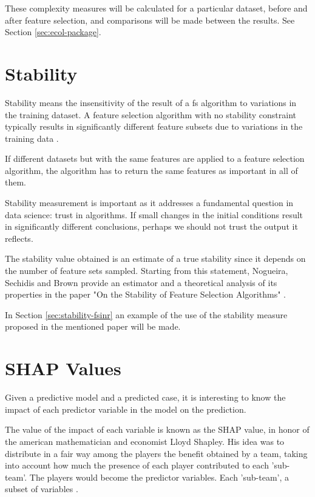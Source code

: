 These complexity measures will be calculated for a particular dataset, before and after feature selection, and comparisons will be made between the results. See Section \ref{sec:ecol-package}.

\section{Stability}
\label{sec:stability}

Stability means the insensitivity of the result of a \acrlong{fs} algorithm to variations in the training dataset. A feature selection algorithm with no stability constraint typically results in significantly different feature subsets due to variations in the training data \cite{LiSiZhou2015}.

If different datasets but with the same features are applied to a feature selection algorithm, the algorithm has to return the same features as important in all of them.

Stability measurement is important as it addresses a fundamental question in data science: trust in algorithms. If small changes in the initial conditions result in significantly different conclusions, perhaps we should not trust the output it reflects.

The stability value obtained is an estimate of a true stability since it depends on the number of feature sets sampled. Starting from this statement, Nogueira, Sechidis and Brown provide an estimator and a theoretical analysis of its properties in the paper "On the Stability of Feature Selection Algorithms" \cite{JMLR2018}.

In Section \ref{sec:stability-fsinr} an example of the use of the stability measure proposed in the mentioned paper will be made.

\section{SHAP Values}
\label{sec:shap-values}

Given a predictive model and a predicted case, it is interesting to know the impact of each predictor variable in the model on the prediction.

The value of the impact of each variable is known as the SHAP value, in honor of the american mathematician and economist Lloyd Shapley. His idea was to distribute in a fair way among the players the benefit obtained by a team, taking into account how much the presence of each player contributed to each 'sub-team'. The players would become the predictor variables. Each 'sub-team', a subset of variables \cite{shap}.


